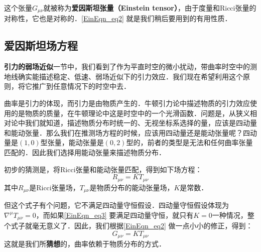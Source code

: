这个张量$G_{\mu\nu}$就被称为\textbf{爱因斯坦张量（Einstein tensor）}，由于度量和Ricci张量的对称性，它也是对称的．\autoref{EinEqn_eq2} 就是我们稍后要用到的有用性质．









\subsection{爱因斯坦场方程}

\textbf{引力的弱场近似}一节中，我们看到了作为平直时空的微小扰动，带曲率时空中的测地线确实能描述稳定、低速、弱场近似下的引力效应．我们现在希望利用这个原则，将它推广到任意情况下的时空中去．

曲率是引力的体现，而引力是由物质产生的．牛顿引力论中描述物质的引力效应使用的是物质的质量，在牛顿理论中这是时空中的一个光滑函数．问题是，从狭义相对论中我们就知道，描述物质分布时统一的、无视坐标系选择的量，应该是四动量和能动张量．那么我们在推测场方程的时候，应该用四动量还是能动张量呢？四动量是$(1, 0)$型张量，能动张量是$(0, 2)$型的，前者的类型是无法和任何曲率张量匹配的．因此我们选择用能动张量来描述物质分布．

初步的猜测是，将Ricci张量和能动张量匹配，得到如下场方程：
\begin{equation}\label{EinEqn_eq3}
R_{\mu\nu}=KT_{\mu\nu}
\end{equation}
其中$R_{\mu\nu}$是Ricci张量场，$T_{\mu\nu}$是物质分布的能动张量场，$K$是常数．

但这个式子有个问题，它不满足四动量守恒假设．四动量守恒假设体现为$\nabla^\mu T_{\mu\nu}=0$，而如果\autoref{EinEqn_eq3} 要满足四动量守恒，就只有$K=0$一种情况，整个式子就毫无意义了．因此，我们根据\autoref{EinEqn_eq2} 做一点小小的修正，得到：
\begin{equation}
G_{\mu\nu}=KT_{\mu\nu}
\end{equation}
这就是我们所\textbf{猜想}的，曲率依赖于物质分布的方式．



